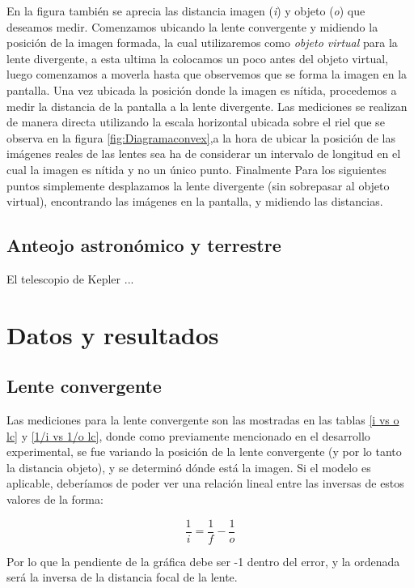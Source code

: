 \documentclass[a4paper,12pt]{article}
\begin{document}
\begin{multicols*}{2}
        En la figura también se aprecia las distancia imagen (\emph{i}) y objeto (\emph{o}) que deseamos medir. Comenzamos ubicando la lente convergente y midiendo la posición de la imagen formada, la cual utilizaremos como \emph{objeto virtual} para la lente divergente, a esta ultima la colocamos un poco antes del objeto virtual, luego comenzamos a moverla hasta que observemos que se forma la imagen en la pantalla. Una vez ubicada la posición donde la imagen es nítida, procedemos a medir la distancia de la pantalla a la lente divergente. Las mediciones se realizan de manera directa utilizando la escala horizontal ubicada sobre el riel que se observa en la figura \ref{fig:Diagramaconvex},a la hora de ubicar la posición de las imágenes reales de las lentes sea ha de considerar un intervalo de longitud en el cual la imagen es nítida y no un único punto. Finalmente 
        Para los siguientes puntos simplemente desplazamos la lente divergente (sin sobrepasar al objeto virtual), encontrando las imágenes en la pantalla, y midiendo las distancias.

    \subsection*{Anteojo astronómico y terrestre}

        El telescopio de Kepler ...

\section*{Datos y resultados}

    \subsection*{Lente convergente}

        Las mediciones para la lente convergente son las mostradas en las tablas \ref{i vs o lc} y \ref{1/i vs 1/o lc}, donde como previamente mencionado en el desarrollo experimental, se fue variando la posición de la lente convergente (y por lo tanto la distancia objeto), y se determinó dónde está la imagen. Si el modelo es aplicable, deberíamos de poder ver una relación lineal entre las inversas de estos valores de la forma:

        \begin{equation*}
            \frac{1}{i} = \frac{1}{f} - \frac{1}{o}
        \end{equation*}

        Por lo que la pendiente de la gráfica debe ser -1 dentro del error, y la ordenada será la inversa de la distancia focal de la lente.


\end{multicols*}
\end{document}

